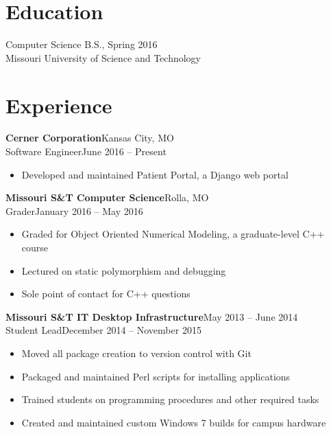 \documentclass[margin]{res}
\begin{document}
  \begin{resume} 
    \section{Education} 
      Computer Science B.S., Spring 2016 \\
      Missouri University of Science and Technology

    \section{Experience}
       \textbf{Cerner Corporation}\hfill Kansas City, MO\\
         Software Engineer\hfill June 2016 -- Present
         \begin{itemize} \itemsep -1pt  %
            \item Developed and maintained Patient Portal, a Django web portal
         \end{itemize}

      \textbf{Missouri S\&T Computer Science}\hfill Rolla, MO\\
         Grader\hfill January 2016 -- May 2016
         \begin{itemize} \itemsep -1pt  %
           \item Graded for Object Oriented Numerical Modeling, a graduate-level C++ course
           \item Lectured on static polymorphism and debugging
           \item Sole point of contact for C++ questions
         \end{itemize}

       \textbf{Missouri S\&T IT Desktop Infrastructure}\hfill May 2013 -- June 2014\\
       Student Lead\hfill December 2014 -- November 2015
       \begin{itemize} \itemsep -1pt  %
         \item Moved all package creation to version control with Git
         \item Packaged and maintained Perl scripts for installing applications
         \item Trained students on programming procedures and other required tasks
         \item Created and maintained custom Windows 7 builds for campus hardware
       \end{itemize}
       

\end{resume}
\end{document}
